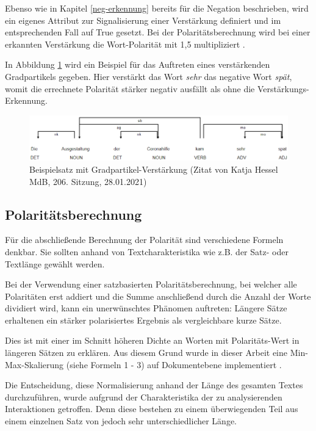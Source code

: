 Ebenso wie in Kapitel \ref{neg-erkennung} bereits für die Negation beschrieben, wird ein eigenes Attribut zur Signalisierung einer Verstärkung definiert und im entsprechenden Fall auf True gesetzt. 
Bei der Polaritätsberechnung wird bei einer erkannten Verstärkung die Wort-Polarität mit 1,5 multipliziert \cite{g3_sentia}. 

In Abbildung \ref{hessel} wird ein Beispiel für das Auftreten eines verstärkenden Gradpartikels gegeben. 
Hier verstärkt das Wort \textit{sehr} das negative Wort \textit{spät}, womit die errechnete Polarität stärker negativ ausfällt als ohne die Verstärkungs-Erkennung. 

\begin{figure}[htb]
\centerline{\includegraphics[width=1\textwidth]{chapters/04-Sentiment-Analyse/hessel.png}}
\caption{Beispielsatz mit Gradpartikel-Verstärkung (Zitat von Katja Hessel MdB, 206. Sitzung, 28.01.2021)}
\label{hessel}
\end{figure}

\subsection{Polaritätsberechnung}
\label{polberechnung}
Für die abschließende Berechnung der Polarität sind verschiedene Formeln denkbar. 
Sie sollten anhand von Textcharakteristika wie z.B. der Satz- oder Textlänge gewählt werden. 

Bei der Verwendung einer satzbasierten Polaritätsberechnung, bei welcher alle Polaritäten erst addiert und die Summe anschließend durch die Anzahl der Worte dividiert wird, kann ein unerwünschtes Phänomen auftreten: 
Längere Sätze erhaltenen ein stärker polarisiertes Ergebnis als vergleichbare kurze Sätze. 

Dies ist mit einer im Schnitt höheren Dichte an Worten mit Polaritäts-Wert in längeren Sätzen zu erklären. 
Aus diesem Grund wurde in dieser Arbeit eine Min-Max-Skalierung (siehe Formeln 1 - 3) auf Dokumentebene implementiert \cite{g3_sentia}. 

Die Entscheidung, diese Normalisierung anhand der Länge des gesamten Textes durchzuführen, wurde aufgrund der Charakteristika der zu analysierenden Interaktionen getroffen. 
Denn diese bestehen zu einem überwiegenden Teil aus einem einzelnen Satz von jedoch sehr unterschiedlicher Länge. 

